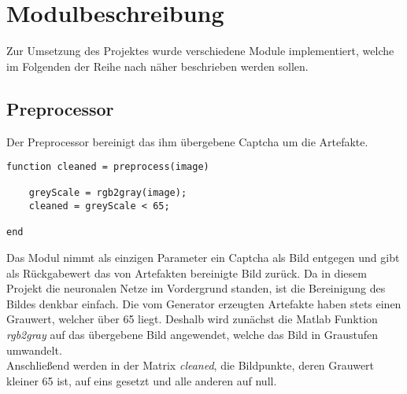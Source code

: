 \section{Modulbeschreibung}
\label{module}
Zur Umsetzung des Projektes wurde verschiedene Module implementiert, welche im Folgenden der Reihe nach näher beschrieben werden sollen.
\subsection{Preprocessor}
Der Preprocessor bereinigt das ihm übergebene Captcha um die Artefakte.
\begin{lstlisting}
function cleaned = preprocess(image)

	greyScale = rgb2gray(image);
	cleaned = greyScale < 65;

end
\end{lstlisting}
Das Modul nimmt als einzigen Parameter ein Captcha als Bild entgegen und gibt als Rückgabewert das von Artefakten bereinigte Bild zurück. Da in diesem Projekt die neuronalen Netze im Vordergrund standen, ist die Bereinigung des Bildes denkbar einfach. Die vom Generator erzeugten Artefakte haben stets einen Grauwert, welcher über 65 liegt. Deshalb wird zunächst die Matlab Funktion \textit{rgb2gray} auf das übergebene Bild angewendet, welche das Bild in Graustufen umwandelt.\\
Anschließend werden in der Matrix \textit{cleaned}, die Bildpunkte, deren Grauwert kleiner 65 ist, auf eins gesetzt und alle anderen auf null.
\newpage

